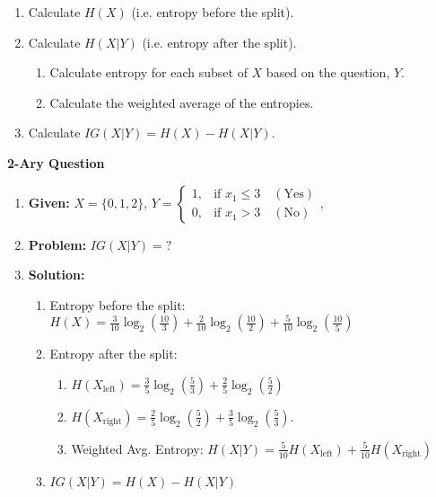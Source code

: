 \begin{process}
    \begin{enumerate}
        \item Calculate \(H(X)\) (i.e. entropy before the split).
        \item Calculate \(H(X|Y)\) (i.e. entropy after the split).
        \begin{enumerate}
            \item Calculate entropy for each subset of \(X\) based on the question, \(Y\).
            \item Calculate the weighted average of the entropies.
        \end{enumerate}
        \item Calculate \(IG(X|Y) = H(X) - H(X|Y)\).
    \end{enumerate}
\end{process}

\begin{example}
\end{example}

\begin{example} \textbf{2-Ary Question}
    \begin{enumerate}
        \item \textbf{Given:} $X= \{0,1,2\}$, $Y = 
        \begin{cases} 
        1, & \text{if } x_1 \leq 3 \quad (\text{Yes}) \\
        0, & \text{if } x_1 > 3 \quad (\text{No})
        \end{cases}$, 
        \item \textbf{Problem:} $IG(X|Y) = ?$
        \item \textbf{Solution:}
        \begin{enumerate}
            \item Entropy before the split: $H(X) = \frac{3}{10} \log_2\left(\frac{10}{3}\right) + \frac{2}{10} \log_2\left(\frac{10}{2}\right) + \frac{5}{10} \log_2\left(\frac{10}{5}\right)$
            \item Entropy after the split: 
            \begin{enumerate}
                \item $H(X_{\text{left}}) = \frac{3}{5} \log_2 \left(\frac{5}{3}\right) + \frac{2}{5} \log_2 \left(\frac{5}{2}\right)$ 
                \item $H(X_{\text{right}}) = \frac{2}{5} \log_2 \left(\frac{5}{2}\right) + \frac{3}{5} \log_2 \left(\frac{5}{3}\right)$.
                \item Weighted Avg. Entropy: $H(X|Y) = \frac{5}{10} H(X_{\text{left}}) + \frac{5}{10} H(X_{\text{right}})$
            \end{enumerate}
            \item $IG(X|Y) = H(X) - H(X|Y)$
        \end{enumerate}
    \end{enumerate}
\end{example}


